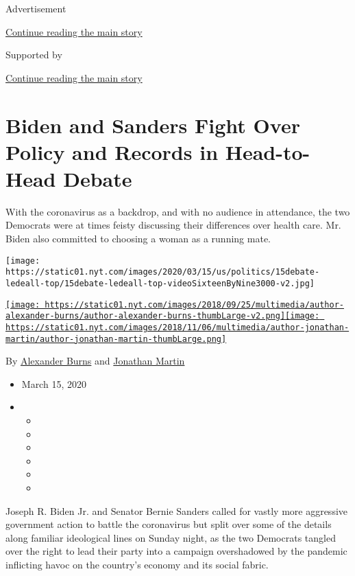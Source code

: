 Advertisement

\protect\hyperlink{after-top}{Continue reading the main story}

Supported by

\protect\hyperlink{after-sponsor}{Continue reading the main story}

\hypertarget{biden-and-sanders-fight-over-policy-and-records-in-head-to-head-debate}{%
\section{Biden and Sanders Fight Over Policy and Records in Head-to-Head
Debate}\label{biden-and-sanders-fight-over-policy-and-records-in-head-to-head-debate}}

With the coronavirus as a backdrop, and with no audience in attendance,
the two Democrats were at times feisty discussing their differences over
health care. Mr. Biden also committed to choosing a woman as a running
mate.

\texttt{[image: https://static01.nyt.com/images/2020/03/15/us/politics/15debate-ledeall-top/15debate-ledeall-top-videoSixteenByNine3000-v2.jpg]}

\href{https://www.nytimes.com/by/alexander-burns}{\texttt{[image: https://static01.nyt.com/images/2018/09/25/multimedia/author-alexander-burns/author-alexander-burns-thumbLarge-v2.png]}}\href{https://www.nytimes.com/by/jonathan-martin}{\texttt{[image: https://static01.nyt.com/images/2018/11/06/multimedia/author-jonathan-martin/author-jonathan-martin-thumbLarge.png]}}

By \href{https://www.nytimes.com/by/alexander-burns}{Alexander Burns}
and \href{https://www.nytimes.com/by/jonathan-martin}{Jonathan Martin}

\begin{itemize}
\item
  March 15, 2020
\item
  \begin{itemize}
  \item
  \item
  \item
  \item
  \item
  \item
  \end{itemize}
\end{itemize}

Joseph R. Biden Jr. and Senator Bernie Sanders called for vastly more
aggressive government action to battle the coronavirus but split over
some of the details along familiar ideological lines on Sunday night, as
the two Democrats tangled over the right to lead their party into a
campaign overshadowed by the pandemic inflicting havoc on the country's
economy and its social fabric.

